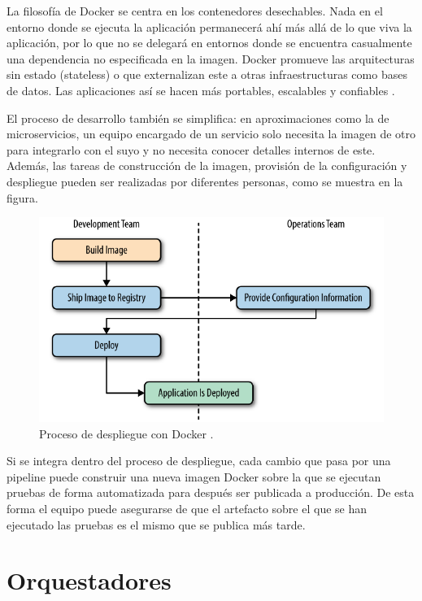 \documentclass[11pt,spanish,listoffigures]{tfgetsinf}
\begin{document}
La filosofía de Docker se centra en los contenedores desechables. Nada en el entorno donde se ejecuta la aplicación permanecerá ahí más allá de lo que viva la aplicación, por lo que no se delegará en entornos donde se encuentra casualmente una dependencia no especificada en la imagen. Docker promueve las arquitecturas sin estado (stateless) o que externalizan este a otras infraestructuras como bases de datos. Las aplicaciones así se hacen más portables, escalables y confiables \cite{Matthias}.

El proceso de desarrollo también se simplifica: en aproximaciones como la de microservicios, un equipo encargado de un servicio solo necesita la imagen de otro para integrarlo con el suyo y no necesita conocer detalles internos de este. Además, las tareas de construcción de la imagen, provisión de la configuración y despliegue pueden ser realizadas por diferentes personas, como se muestra en la figura. 

\begin{figure}[h]
\centering
\includegraphics[scale=0.7]{docker_process}
\caption{Proceso de despliegue con Docker \cite{Matthias}.}
\end{figure}


Si se integra dentro del proceso de despliegue, cada cambio que pasa por una pipeline puede construir una nueva imagen Docker sobre la que se ejecutan pruebas de forma automatizada para después ser publicada a producción. De esta forma el equipo puede asegurarse de que el artefacto sobre el que se han ejecutado las pruebas es el mismo que se publica más tarde. 

\section{Orquestadores}
\end{document}
